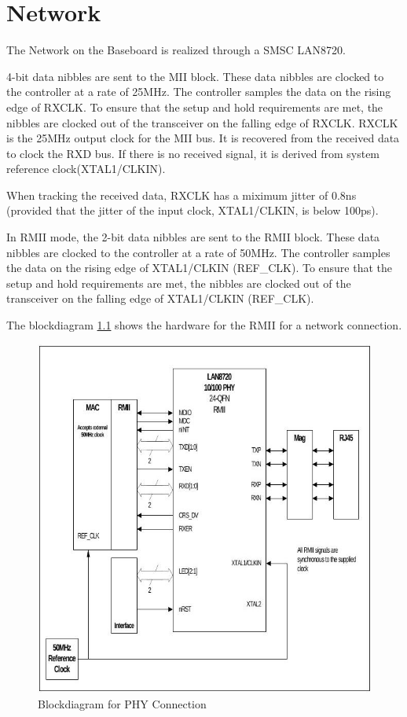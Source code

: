 \chapter{Network}
The Network on the Baseboard is realized through a SMSC LAN8720.

4-bit data nibbles are sent to the MII block. These data nibbles are clocked
to the controller at a rate of 25MHz. The controller samples the data on the
rising edge of RXCLK. To ensure that the setup and hold requirements are met,
the nibbles are clocked out of the transceiver on the falling edge of RXCLK.
RXCLK is the 25MHz output clock for the MII bus. It is recovered from the received
data to clock the RXD bus. If there is no received signal, it is derived from
system reference clock(XTAL1/CLKIN).

When tracking the received data, RXCLK has a miximum jitter of 0.8ns (provided
that the jitter of the input clock, XTAL1/CLKIN, is below 100ps).

In RMII mode, the 2-bit data nibbles are sent to the RMII block. These data nibbles
are clocked to the controller at a rate of 50MHz. The controller samples the data
on the rising edge of XTAL1/CLKIN (REF\_CLK). To ensure that the setup and hold
requirements are met, the nibbles are clocked out of the transceiver on the falling
edge of XTAL1/CLKIN (REF\_CLK).

The blockdiagram \ref{stm32f4_phy} shows the hardware for the RMII for
a network connection.

\begin{figure}[h!]
	\centering
	\includegraphics[totalheight=0.36\textheight]{../img/network.jpeg}
	\caption{Blockdiagram for PHY Connection}
	\label{stm32f4_phy}
\end{figure}

